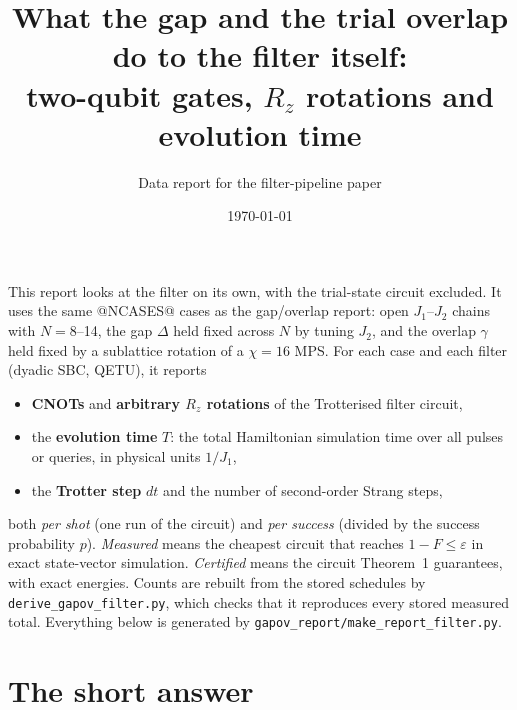 \documentclass[10pt]{article}
\title{What the gap and the trial overlap do to the filter itself:\\ two-qubit gates, $R_z$ rotations and evolution time}
\author{Data report for the filter-pipeline paper}
\date{\today}
\begin{document}
\maketitle

\noindent This report looks at the filter on its own, with the trial-state circuit excluded. It uses the same
@NCASES@ cases as the gap/overlap report: open $J_1$--$J_2$ chains with $N=8$--14, the gap $\Delta$ held fixed
across $N$ by tuning $J_2$, and the overlap $\gamma$ held fixed by a sublattice rotation of a $\chi=16$ MPS.
For each case and each filter (dyadic SBC, QETU), it reports
\begin{itemize}
\item \textbf{CNOTs} and \textbf{arbitrary $R_z$ rotations} of the Trotterised filter circuit,
\item the \textbf{evolution time} $T$: the total Hamiltonian simulation time over all pulses or queries, in physical
units $1/J_1$,
\item the \textbf{Trotter step} $dt$ and the number of second-order Strang steps,
\end{itemize}
both \emph{per shot} (one run of the circuit) and \emph{per success} (divided by the success probability $p$).
\emph{Measured} means the cheapest circuit that reaches $1-F\le\varepsilon$ in exact state-vector simulation.
\emph{Certified} means the circuit Theorem~1 guarantees, with exact energies. Counts are rebuilt from the stored
schedules by \texttt{derive\_gapov\_filter.py}, which checks that it reproduces every stored measured total.
Everything below is generated by \texttt{gapov\_report/make\_report\_filter.py}.

\section{The short answer}
\end{document}
